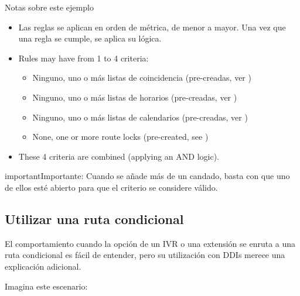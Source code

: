 \documentclass[letterpaper,10pt,spanish]{sphinxmanual}
\begin{document}
Notas sobre este ejemplo
\begin{itemize}
\item {} 
Las reglas se aplican en orden de métrica, de menor a mayor. Una vez que una regla se cumple, se aplica su lógica.

\item {} 
Rules may have from 1 to 4 criteria:
\begin{itemize}
\item {} 
Ninguno, uno o más listas de coincidencia (pre-creadas, ver {\hyperref[pbx_features/match_lists:match\string-lists]{}})

\item {} 
Ninguno, uno o más listas de horarios (pre-creadas, ver {\hyperref[pbx_features/external_filters:schedules]{}})

\item {} 
Ninguno, uno o más listas de calendarios (pre-creadas, ver {\hyperref[pbx_features/external_filters:calendars]{}})

\item {} 
None, one or more route locks (pre-created, see {\hyperref[pbx_features/route_locks:route\string-locks]{}})

\end{itemize}

\item {} 
These 4 criteria are combined (applying an AND logic).

\end{itemize}

\begin{notice}{important}{Importante:}
Cuando se añade más de un candado, basta con que uno de ellos esté abierto para que el criterio se considere válido.
\end{notice}


\subsection{Utilizar una ruta condicional}
\label{pbx_features/conditional_routes:using-a-conditional-route}
El comportamiento cuando la opción de un IVR o una extensión se enruta a una ruta condicional es fácil de entender, pero su utilización con DDIs merece una explicación adicional.

Imagina este escenario:
\end{document}
